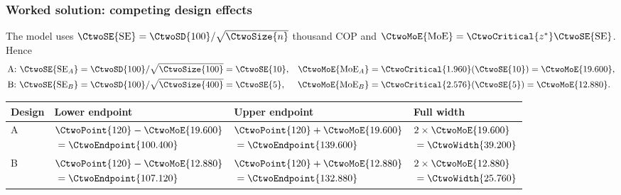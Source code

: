 \subsubsection*{Worked solution: competing design effects}\label{sol:c3-3}
The model uses $\CtwoSE{\mathrm{SE}}=\CtwoSD{100}/\sqrt{\CtwoSize{n}}$ thousand COP and $\CtwoMoE{\mathrm{MoE}}=\CtwoCritical{z^*}\CtwoSE{\mathrm{SE}}$. Hence
\begin{align*}
\text{A: }\CtwoSE{\mathrm{SE}_A}&=\CtwoSD{100}/\sqrt{\CtwoSize{100}}=\CtwoSE{10},&
\CtwoMoE{\mathrm{MoE}_A}&=\CtwoCritical{1.960}(\CtwoSE{10})=\CtwoMoE{19.600},\\
\text{B: }\CtwoSE{\mathrm{SE}_B}&=\CtwoSD{100}/\sqrt{\CtwoSize{400}}=\CtwoSE{5},&
\CtwoMoE{\mathrm{MoE}_B}&=\CtwoCritical{2.576}(\CtwoSE{5})=\CtwoMoE{12.880}.
\end{align*}
\begin{center}\begingroup\setlength{\jot}{0pt}\begin{tabular}{@{}llll@{}}\toprule
Design & Lower endpoint & Upper endpoint & Full width\\\midrule
A & $\begin{aligned}[t]&\CtwoPoint{120}-\CtwoMoE{19.600}\\ &= \CtwoEndpoint{100.400}\end{aligned}$ & $\begin{aligned}[t]&\CtwoPoint{120}+\CtwoMoE{19.600}\\ &= \CtwoEndpoint{139.600}\end{aligned}$ & $\begin{aligned}[t]&2\times\CtwoMoE{19.600}\\ &= \CtwoWidth{39.200}\end{aligned}$\\[3pt]
B & $\begin{aligned}[t]&\CtwoPoint{120}-\CtwoMoE{12.880}\\ &= \CtwoEndpoint{107.120}\end{aligned}$ & $\begin{aligned}[t]&\CtwoPoint{120}+\CtwoMoE{12.880}\\ &= \CtwoEndpoint{132.880}\end{aligned}$ & $\begin{aligned}[t]&2\times\CtwoMoE{12.880}\\ &= \CtwoWidth{25.760}\end{aligned}$\\\bottomrule
\end{tabular}\endgroup\end{center}
